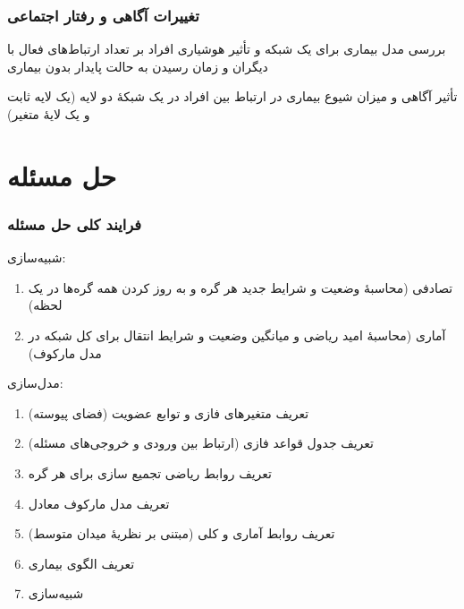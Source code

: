 \documentclass[xcolor=dvipsnames, professionalfonts, aspectratio=169, 11pt]{beamer}
\begin{document}
\begin{frame}
    \frametitle{تغییرات آگاهی و رفتار اجتماعی}

    \begin{moredi}
        \item بررسی مدل بیماری  برای یک شبکه و تأثیر هوشیاری افراد بر تعداد ارتباط‌های فعال با دیگران و زمان رسیدن به حالت پایدار بدون بیماری \cite{li2019control,bhowmick2020influence}
        \item تأثیر آگاهی و میزان شیوع بیماری در ارتباط بین افراد در یک شبکهٔ دو لایه (یک لایه ثابت و یک لایهٔ متغیر)\cite{sahneh2019contact}
    \end{moredi}

\end{frame}

\section{حل مسئله}
\begin{frame}
    \frametitle{فرایند کلی حل مسئله}
    {
        شبیه‌سازی:
        \begin{enumerate}\RTList
            \item<-1> تصادفی (محاسبهٔ وضعیت و شرایط جدید هر گره و به روز کردن همه گره‌ها در یک لحظه)
            \item<2-> آماری (محاسبهٔ امید ریاضی و میانگین وضعیت و شرایط انتقال برای کل شبکه در مدل مارکوف)

        \end{enumerate}

        مدل‌سازی:
        \begin{enumerate}\RTList
            \item تعریف متغیرهای فازی و توابع عضویت (فضای پیوسته)
            \item تعریف جدول قواعد فازی (ارتباط بین ورودی و خروجی‌های مسئله)
            \item تعریف روابط ریاضی تجمیع سازی برای هر گره
            \item<2-> تعریف مدل مارکوف معادل
            \item<2-> تعریف روابط آماری و کلی (مبتنی بر نظریهٔ میدان متوسط)
            \item<1> تعریف الگوی بیماری
            \item شبیه‌سازی

        \end{enumerate}
    }
\end{frame}
\end{document}
